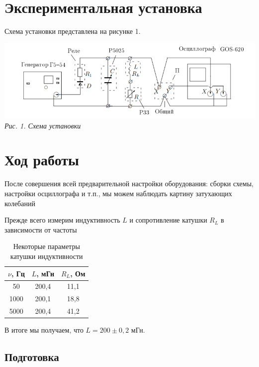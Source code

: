 \documentclass[a4paper, 12pt]{article}%
\begin{document}
\section{Экспериментальная установка}

Схема установки представлена на рисунке 1.

\begin{center}

    \includegraphics[scale=0.6]{324_scheme.png} \\
    \textit{Рис. 1. Схема установки}

\end{center}

\section{Ход работы}

После совершения всей предварительной настройки оборудования: сборки схемы, настройки осциллографа и т.п., мы можем наблюдать картину затухающих колебаний  

Прежде всего измерим индуктивность $L$ и сопротивление катушки $R_L$ в зависимости от частоты 

\begin{table}[h!]
\begin{center}

\begin{tabular}{|c|c|c|}
\hline
$\nu$, Гц & $L$, мГн & $R_L$, Ом \\ \hline
50        & 200,4    & 11,1      \\ \hline
1000      & 200,1    & 18,8      \\ \hline
5000      & 200,4    & 41,2      \\ \hline
\end{tabular}
\caption{Некоторые параметры катушки индуктивности}
\end{center}
\end{table}
В итоге мы получаем, что $L = 200 \pm 0,2$ мГн.
\newpage

\subsection{Подготовка}
\end{document}
